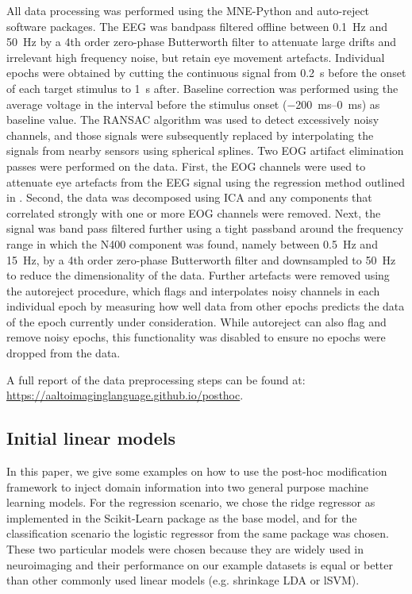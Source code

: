 \documentclass[a4paper]{vanvliet_paper}
\begin{document}
All data processing was performed using the MNE-Python\cite{Gramfort2013} and auto-reject\cite{Jas2017} software packages.
The \gls{EEG} was bandpass filtered offline between \SI{0.1}{\hertz} and \SI{50}{\hertz} by a 4th order zero-phase Butterworth filter to attenuate large drifts and irrelevant high frequency noise, but retain eye movement artefacts.
Individual epochs were obtained by cutting the continuous signal from \SI{0.2}{\second} before the onset of each target stimulus to \SI{1}{\second} after.
Baseline correction was performed using the average voltage in the interval before the stimulus onset (\SIrange{-200}{0}{\milli\second}) as baseline value.
The \gls{RANSAC} algorithm was used to detect excessively noisy channels, and those signals were subsequently replaced by interpolating the signals from nearby sensors using spherical splines\cite{Perrin1989}.
Two \gls{EOG} artifact elimination passes were performed on the data.
First, the \gls{EOG} channels were used to attenuate eye artefacts from the \gls{EEG} signal using the regression method outlined in \textcite{Croft2000}.
Second, the data was decomposed using \gls{ICA} and any components that correlated strongly with one or more \gls{EOG} channels were removed. 
Next, the signal was band pass filtered further using a tight passband around the frequency range in which the N400 component was found, namely between \SI{0.5}{\hertz} and \SI{15}{\hertz}, by a 4th order zero-phase Butterworth filter and downsampled to \SI{50}{\hertz} to reduce the dimensionality of the data.
Further artefacts were removed using the autoreject procedure\cite{Jas2017}, which flags and interpolates noisy channels in each individual epoch by measuring how well data from other epochs predicts the data of the epoch currently under consideration.
While autoreject can also flag and remove noisy epochs, this functionality was disabled to ensure no epochs were dropped from the data.

A full report of the data preprocessing steps can be found at:\\
\url{https://aaltoimaginglanguage.github.io/posthoc}.


\subsection{Initial linear models}\label{sec:init}

In this paper, we give some examples on how to use the post-hoc modification framework to inject domain information into two general purpose machine learning models.
For the regression scenario, we chose the ridge regressor as implemented in the Scikit-Learn package\cite{Pedregosa2012} as the base model, and for the classification scenario the logistic regressor from the same package was chosen.
These two particular models were chosen because they are widely used in neuroimaging and their performance on our example datasets is equal or better than other commonly used linear models (e.g. shrinkage \gls{LDA} or \gls{lSVM}).
\end{document}
